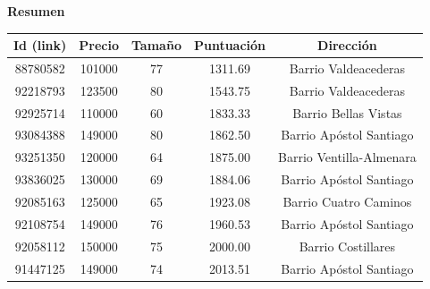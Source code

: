 \documentclass[10pt,a4paper]{report}
\begin{document}
{\LARGE \textbf{Resumen}}

\begin{center}
\begin{tabular}{|c|c|c|c|c|}
\hline
Id (link) & Precio & Tamaño & Puntuación & Dirección \\\hline\hline
88780582 & 101000 & 77 & 1311.69 & Barrio Valdeacederas \\\hline
92218793 & 123500 & 80 & 1543.75 & Barrio Valdeacederas \\\hline
92925714 & 110000 & 60 & 1833.33 & Barrio Bellas Vistas \\\hline
93084388 & 149000 & 80 & 1862.50 & Barrio Apóstol Santiago \\\hline
93251350 & 120000 & 64 & 1875.00 & Barrio Ventilla-Almenara \\\hline
93836025 & 130000 & 69 & 1884.06 & Barrio Apóstol Santiago \\\hline
92085163 & 125000 & 65 & 1923.08 & Barrio Cuatro Caminos \\\hline
92108754 & 149000 & 76 & 1960.53 & Barrio Apóstol Santiago \\\hline
92058112 & 150000 & 75 & 2000.00 & Barrio Costillares \\\hline
91447125 & 149000 & 74 & 2013.51 & Barrio Apóstol Santiago \\\hline
\end{tabular}
\end{center}
\end{document}
